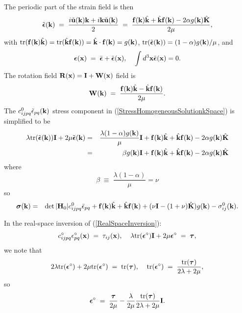 \documentclass[12pt]{article}
\def\bmath#1{\mbox{\boldmath$#1$}}
\begin{document}
The periodic part of the strain field is then
\begin{equation}
 \tilde{\bmath{\epsilon}}({\bf k}) \;=\; \frac{i\tilde{\bf u}({\bf k}){\bf k}+i{\bf k}\tilde{\bf u}({\bf k})}{2} \;=\;
\frac{{\bf f}({\bf k})\hat{\bf k}+\hat{\bf k}{\bf f}({\bf k}) - 2\alpha g({\bf k})\hat{\bf K}}
 {2\mu},
\end{equation}
with ${\rm tr}({\bf f}({\bf k})\hat{\bf k})={\rm tr}(\hat{\bf k}{\bf
f}({\bf k}))=\hat{\bf k}\cdot {\bf f}({\bf k})=g({\bf k})$, ${\rm tr}(\tilde{\bmath{\epsilon}}({\bf k}))=(1-\alpha)g({\bf k})/\mu$, and
\begin{equation}
 \bmath{\epsilon}({\bf x}) \;=\; \bar{\bmath{\epsilon}} + 
 \tilde{\bmath{\epsilon}}({\bf x}), \;\;\;\;
 \int d^3{\bf x} \tilde{\bmath{\epsilon}}({\bf x}) = 0.
\end{equation}
The rotation field ${\bf R}({\bf x})={\bf I}+{\bf W}({\bf x})$ 
 field is
\begin{equation}
 {\bf W}({\bf k}) \;=\; 
\frac{{\bf f}({\bf k})\hat{\bf k}-\hat{\bf k}{\bf f}({\bf k})}
 {2\mu}.
\end{equation}
The $c_{ijpq}^0\tilde{\epsilon}_{pq}({\bf k})$
stress component in (\ref{StressHomogeneousSolutionkSpace}) is simplified to be
\begin{eqnarray}
 \lambda {\rm tr}(\tilde{\bmath{\epsilon}}({\bf k})){\bf I} + 2\mu \tilde{\bmath{\epsilon}}({\bf k})  =&&  
\frac{\lambda(1-\alpha)g({\bf k})}{\mu}{\bf I} + 
 {\bf f}({\bf k})\hat{\bf k}+\hat{\bf k}{\bf f}({\bf k}) - 2\alpha g({\bf k})\hat{\bf K} \nonumber\\
 =&& \beta g({\bf k}){\bf I} + {\bf f}({\bf k})\hat{\bf k}+\hat{\bf k}{\bf f}({\bf k}) - 2\alpha g({\bf k})\hat{\bf K}
\end{eqnarray}
where
\begin{equation}
 \beta \;\equiv\; \frac{\lambda(1-\alpha)}{\mu} = \nu
\end{equation}
so
\begin{eqnarray}
 \bmath{\sigma}({\bf k}) =&& \det|{\bf H}_0|c_{ijpq}^0\bar{\epsilon}_{pq} 
+ {\bf f}({\bf k})\hat{\bf k}+\hat{\bf k}{\bf f}({\bf k}) 
+ (\nu{\bf I}-(1+\nu)\hat{\bf K})g({\bf k})  - \sigma^0_{ij}({\bf k}).
\label{StressIsotropicHomogeneousSolutionkSpace2D}
\end{eqnarray}

In the real-space inversion of (\ref{RealSpaceInversion}):
\begin{equation}
 c^\circ_{ijpq} \epsilon^\circ_{pq}({\bf x}) 
 \;=\; \tau_{ij}({\bf x}), \;\;\;\;
 \lambda{\rm tr}(\bmath{\epsilon}^\circ){\bf I} + 
 2\mu\bmath{\epsilon}^\circ \;=\; \bmath{\tau},
\end{equation}
we note that
\begin{equation}
 2\lambda{\rm tr}(\bmath{\epsilon}^\circ) + 
 2\mu {\rm tr}(\bmath{\epsilon}^\circ)
\;=\; {\rm tr}(\bmath{\tau}), \;\;\;\;
 {\rm tr}(\bmath{\epsilon}^\circ) \;=\; 
 \frac{{\rm tr}(\bmath{\tau})}{2\lambda+2\mu},
\end{equation}
so 
\begin{equation}
  \bmath{\epsilon}^\circ \;=\; \frac{\bmath{\tau}}{2\mu} - 
  \frac{\lambda}{2\mu}
 \frac{{\rm tr}(\bmath{\tau})}{2\lambda+2\mu} {\bf I}.
 \label{IsotropicStrainStress2D}
\end{equation}



\end{document}
